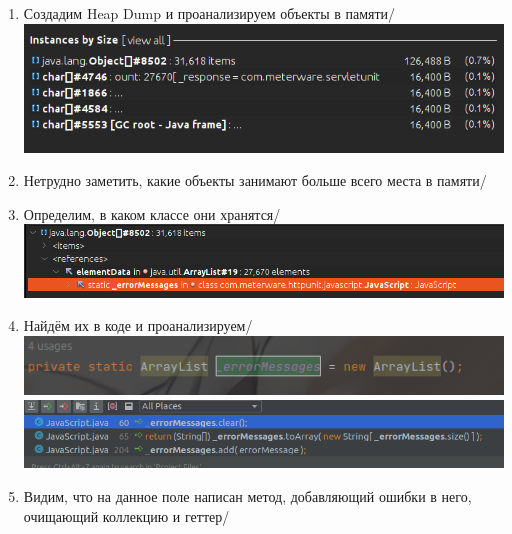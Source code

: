 \begin{enumerate}
    \item Создадим Heap Dump и проанализируем объекты в памяти/\\
    \includegraphics[scale=0.5]{img/Ex4pics/heap_dump}
    \item Нетрудно заметить, какие объекты занимают больше всего места в памяти/\\
    \item Определим, в каком классе они хранятся/\\
    \includegraphics[scale=0.5]{img/Ex4pics/error_messages}
    \item Найдём их в коде и проанализируем/\\
    \includegraphics[scale=0.5]{img/Ex4pics/error_messages_in_code}\\
    \includegraphics[scale=0.5]{img/Ex4pics/error_messages_usage}
    \item Видим, что на данное поле написан метод, добавляющий ошибки в него, очищающий коллекцию и геттер/
    \newpage

    \thispagestyle{empty}

    \BgThispage


\end{enumerate}
